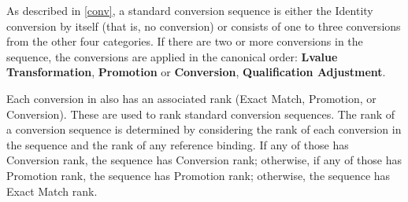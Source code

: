 \pnum
\begin{note}
As described in \ref{conv},
a standard conversion sequence is either the Identity conversion
by itself (that is, no conversion) or consists of one to three
conversions from the other
four categories.
If there are two or more conversions in the sequence, the
conversions are applied in the canonical order:
\textbf{Lvalue Transformation},
\textbf{Promotion}
or
\textbf{Conversion},
\textbf{Qualification Adjustment}.
\end{note}

\pnum
{}%
Each conversion in 
also has an associated rank (Exact
Match, Promotion, or Conversion).
These are used
to rank standard conversion sequences.
The rank of a conversion sequence is determined by considering the
rank of each conversion in the sequence and the rank of any reference
binding.
If any of those has Conversion rank, the
sequence has Conversion rank; otherwise, if any of those has Promotion rank,
the sequence has Promotion rank; otherwise, the sequence has Exact
Match rank.


